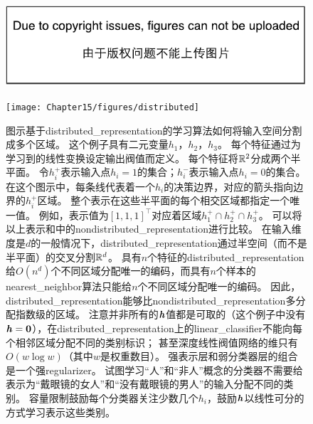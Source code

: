 \begin{figure}[!htb]
\ifOpenSource
\centerline{\includegraphics{figure.pdf}}
\else
\centerline{\texttt{[image: Chapter15/figures/distributed]}}
\fi
\caption{图示基于\gls{distributed_representation}的学习算法如何将输入空间分割成多个区域。
这个例子具有二元变量$h_1$，$h_2$，$h_3$。
每个特征通过为学习到的线性变换设定输出阀值而定义。
每个特征将$\mathbb{R}^2$分成两个半平面。
令$h_i^+$表示输入点$h_i=1$的集合；$h_i^-$表示输入点$h_i=0$的集合。
在这个图示中，每条线代表着一个$h_i$的决策边界，对应的箭头指向边界的$h_i^+$区域。
整个表示在这些半平面的每个相交区域都指定一个唯一值。
例如，表示值为$[1,1,1]^\top$对应着区域$h_1^+ \cap h_2^+ \cap h_3^+$。
可以将以上表示和中的\gls{nondistributed_representation}进行比较。
在输入维度是$d$的一般情况下，\gls{distributed_representation}通过半空间（而不是半平面）的交叉分割$\mathbb{R}^d$。
具有$n$个特征的\gls{distributed_representation}给$O(n^d)$个不同区域分配唯一的编码，而具有$n$个样本的\gls{nearest_neighbor}算法只能给$n$个不同区域分配唯一的编码。
因此，\gls{distributed_representation}能够比\gls{nondistributed_representation}多分配指数级的区域。
注意并非所有的$\boldsymbol{\mathit{h}}$值都是可取的（这个例子中没有$\boldsymbol{\mathit{h}}=\mathbf{0}$），在\gls{distributed_representation}上的\gls{linear_classifier}不能向每个相邻区域分配不同的类别标识；
甚至深度线性阀值网络的维只有$O(w\log w)$（其中$w$是权重数目）\citep{sontag1998vc}。
强表示层和弱分类器层的组合是一个强\gls{regularizer}。
试图学习``人''和``非人''概念的分类器不需要给表示为``戴眼镜的女人''和``没有戴眼镜的男人''的输入分配不同的类别。
容量限制鼓励每个分类器关注少数几个$h_i$，鼓励$\boldsymbol{\mathit{h}}$以线性可分的方式学习表示这些类别。
}
\label{fig:chap15_distributed}
\end{figure}

